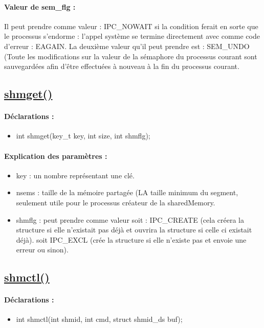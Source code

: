 \documentclass{article}[12pt]
\begin{document}
\paragraph{Valeur de sem\_flg : } Il peut prendre comme valeur : IPC\_NOWAIT si la condition ferait en sorte que le processus s'endorme : l'appel système se termine directement avec comme code d'erreur : EAGAIN. La deuxième valeur qu'il peut prendre est : SEM\_UNDO (Toute les modifications sur la valeur de la sémaphore du processus courant sont sauvegardées afin d'être effectuées à nouveau à la fin du processus courant. 
\subsection{\href{http://jp.barralis.com/linux-man/man2/shmget.2.php}{shmget()}}
\paragraph{Déclarations : }
\begin{itemize}
	\item int shmget(key\_t key, int size, int shmflg);
\end{itemize}
\paragraph{Explication des paramètres : }
\begin{itemize}
\item key : un nombre représentant une clé.
\item nsems : taille de la mémoire partagée (LA taille minimum du segment, seulement utile pour le processus créateur de la sharedMemory. 
\item shmflg :  peut prendre comme valeur soit : IPC\_CREATE (cela créera la structure si elle n'existait pas déjà et ouvrira la structure si celle ci existait déjà). soit IPC\_EXCL (crée la structure si elle n'existe pas et envoie une erreur ou sinon).   
\end{itemize}
\subsection{\href{http://jp.barralis.com/linux-man/man2/shmctl.2.php}{shmctl()}}
\paragraph{Déclarations : }
\begin{itemize}
	\item int shmctl(int shmid, int cmd, struct shmid\_ds \*buf);
\end{itemize}
\end{document}
